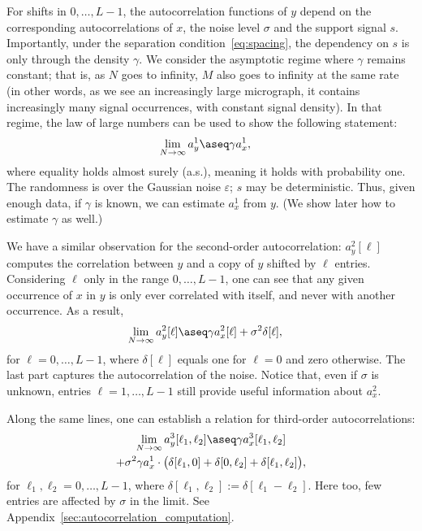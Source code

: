 \documentclass[9pt,twocolumn,twoside,lineno]{pnas-new}
\begin{document}
For shifts in $0, \ldots, L-1$, the autocorrelation functions of $y$ depend on the corresponding autocorrelations of $x$, the noise level $\sigma$ and the support signal $s$. Importantly, under the separation condition~\eqref{eq:spacing}, the dependency on $s$ is only through the density $\gamma$.
We consider the asymptotic regime where $\gamma$ remains constant; that is, as $N$ goes to infinity, $M$ also goes to infinity at the same rate (in other words, as we see an increasingly large micrograph, it contains increasingly many signal occurrences, with constant signal density). In that regime, the law of large numbers can be used to show the following statement:
\begin{align} \label{eq:mean_micrograph}
\lim_{N\to\infty} a_y^1 & \aseq \gamma a_{x}^1,
\end{align}
where equality holds almost surely (a.s.), meaning it holds with probability one.
The randomness is over the Gaussian noise $\varepsilon$; $s$ may be deterministic.
Thus, given enough data, if $\gamma$ is known, we can estimate $a_x^1$ from $y$. (We show later how to estimate $\gamma$ as well.) 

We have a similar observation for the second-order autocorrelation: $a_y^2[\ell]$ computes the correlation between $y$ and a copy of $y$ shifted by $\ell$ entries. Considering $\ell$ only in the range $0, \ldots, L-1$, one can see that any given occurrence of $x$ in $y$ is only ever correlated with itself, and never with another occurrence. As a result,
\begin{align}
	\lim_{N\to\infty} a_y^2[\ell] & \aseq \gamma a_{x}^2[\ell] + \sigma^2\delta[\ell],
	\label{eq:ac2_micrograph}
\end{align}
for $\ell = 0, \ldots, L-1$, where $\delta[\ell]$ equals one for $\ell=0$ and zero otherwise. The last part captures the autocorrelation of the noise. Notice that, even if $\sigma$ is unknown, entries $\ell = 1, \ldots, L-1$ still provide useful information about $a_x^2$.

Along the same lines, one can establish a relation for third-order autocorrelations:
\begin{multline}
\lim_{N\to\infty} a_y^3[\ell_1,\ell_2] \aseq \gamma a_{x}^3[\ell_1,\ell_2] \label{eq:ac3_micrograph} \\ + \sigma^2\gamma a_{x}^1 \cdot \big(\delta[\ell_1,0]+\delta[0,\ell_2]+\delta[\ell_1,\ell_2]\big),
\end{multline}
for $\ell_1,\ell_2 = 0, \ldots, L-1$, where $\delta[\ell_1,\ell_2]:=\delta[\ell_1-\ell_2]$.
Here too, few entries are affected by $\sigma$ in the limit.
See Appendix~\ref{sec:autocorrelation_computation}.
\end{document}

